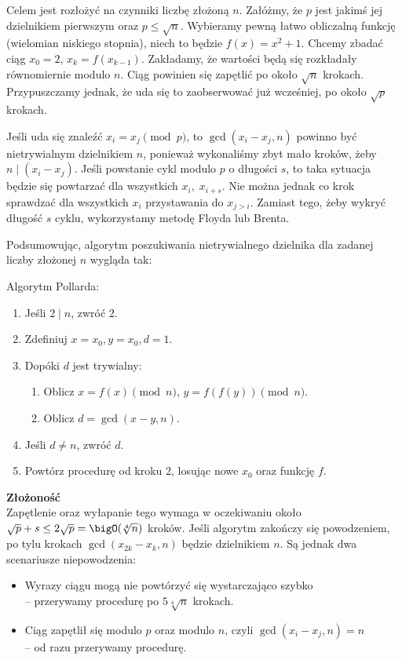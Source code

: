 Celem jest rozłożyć na czynniki liczbę złożoną \( n \). Załóżmy, że \( p \) jest jakimś jej dzielnikiem pierwszym oraz \( p \leq \sqrt{n} \).
Wybieramy pewną łatwo obliczalną funkcję (wielomian niskiego stopnia), niech to będzie \( f(x) = x^2 + 1 \). Chcemy zbadać ciąg \( x_0 = 2 \), \( x_k = f(x_{k-1}) \).
Zakładamy, że wartości będą się rozkładały równomiernie modulo \( n \). Ciąg powinien się zapętlić po około \( \sqrt{n} \) krokach. Przypuszczamy jednak, że uda się to zaobserwować już wcześniej, po około \( \sqrt{p} \) krokach.

Jeśli uda się znaleźć \( x_i = x_j \pmod{p} \), to \( \gcd(x_i - x_j, n) \) powinno być nietrywialnym dzielnikiem \( n \), ponieważ wykonaliśmy zbyt mało kroków, żeby \( n \mid (x_i - x_j) \).
Jeśli powstanie cykl modulo \( p \) o długości \( s \), to taka sytuacja będzie się powtarzać dla wszystkich \( x_i,\; x_{i+s} \). Nie można jednak co krok sprawdzać dla wszystkich \( x_i \) przystawania do \( x_{j > i} \).
Zamiast tego, żeby wykryć długość \( s \) cyklu, wykorzystamy metodę Floyda lub Brenta.

Podsumowując, algorytm poszukiwania nietrywialnego dzielnika dla zadanej liczby złożonej \( n \) wygląda tak:
\begin{greyframe}
    Algorytm Pollarda:
    \begin{enumerate}
        \item Jeśli \( 2 \mid n \), zwróć 2.
        \item Zdefiniuj \( x = x_0, y = x_0, d = 1 \).
        \item Dopóki \( d \) jest trywialny:
        \begin{enumerate}
            \item Oblicz \( x = f(x) \pmod{n} \), \( y = f(f(y)) \pmod{n} \).
            \item Oblicz \( d = \gcd(x-y, n) \).
        \end{enumerate}
        \item Jeśli \( d \neq n \), zwróć \( d \).
        \item Powtórz procedurę od kroku 2, losując nowe \( x_0 \) oraz funkcję \( f \).
    \end{enumerate}
\end{greyframe}

\textbf{Złożoność} \\
Zapętlenie oraz wyłapanie tego wymaga w oczekiwaniu około \( \sqrt{p} + s \leq 2\sqrt{p} = \bigO(\sqrt[4]{n}) \) kroków. Jeśli algorytm zakończy się powodzeniem, po tylu krokach \( \gcd(x_{2k} - x_k, n )\) będzie dzielnikiem \( n \).
Są jednak dwa scenariusze niepowodzenia:
\begin{itemize}
    \item Wyrazy ciągu mogą nie powtórzyć się wystarczająco szybko \\
    -- przerywamy procedurę po \( 5\sqrt[4]{n} \) krokach.
    \item Ciąg zapętlił się modulo \( p \) oraz modulo \( n \), czyli \( \gcd(x_i - x_j, n) = n \) \\
    -- od razu przerywamy procedurę.
\end{itemize}

